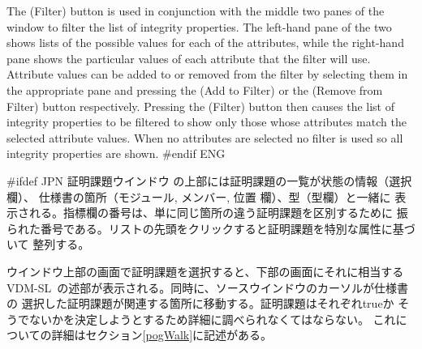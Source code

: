 \documentclass[\pformat,12pt]{article}
\newcommand{\vdmslpp}{VDM-SL}
\newcommand{\vdmslpp}{VDM++}
\newcommand{\guicmd}[1]{{\sf #1}}
\newcommand{\guicmd}[1]{{\gt #1}}
\begin{document}
The
(\guicmd{Filter}) button is used in conjunction with the middle two
panes of the window to filter the list of integrity properties. The
left-hand pane of the two shows lists of the possible values for each
of 
the attributes, while the right-hand pane shows the particular values
of each attribute that the filter will use. Attribute values can be
added to or removed from the filter by selecting them in the
appropriate pane and pressing the 
(\guicmd{Add to Filter}) or the 
(\guicmd{Remove from Filter}) button respectively. Pressing the 
(\guicmd{Filter}) button then causes the list of integrity properties
to be filtered to show only those whose attributes match the selected
attribute values. When no attributes are selected no filter is used so
all integrity properties are shown.
#endif ENG

#ifdef JPN
\guicmd{証明課題ウインドウ} の上部には証明課題の一覧が状態の情報（\guicmd{選択}欄）、
仕様書の箇所（\guicmd{モジュール}, \guicmd{メンバー}, \guicmd{位置} 欄）、型（\guicmd{型}欄）と一緒に
表示される。\guicmd{指標}欄の番号は、単に同じ箇所の違う証明課題を区別するために
振られた番号である。リストの先頭をクリックすると証明課題を特別な属性に基づいて
整列する。

ウインドウ上部の画面で証明課題を選択すると、下部の画面にそれに相当する
\vdmslpp\ の述部が表示される。同時に、ソースウインドウのカーソルが仕様書の
選択した証明課題が関連する箇所に移動する。証明課題はそれぞれtrueか
そうでないかを決定しようとするため詳細に調べられなくてはならない。
これについての詳細はセクション\ref{pogWalk}に記述がある。
\end{document}
